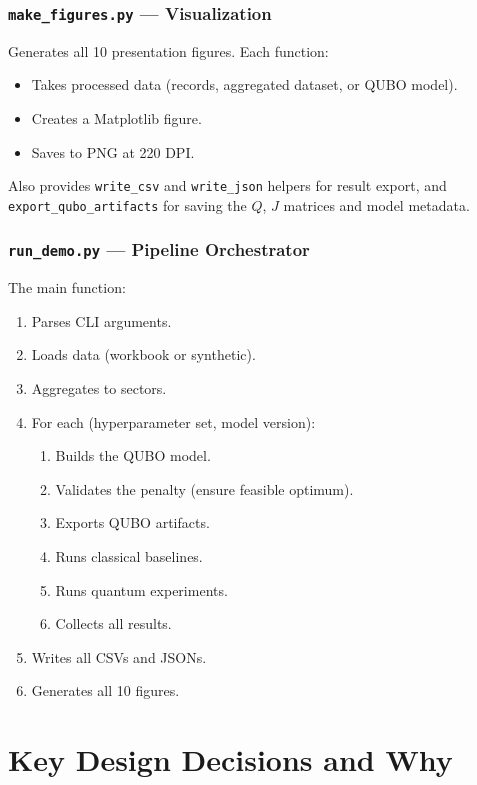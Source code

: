 \documentclass[12pt, a4paper]{article}
\begin{document}
\subsubsection{\texttt{make\_figures.py} --- Visualization}

Generates all 10 presentation figures. Each function:
\begin{itemize}
    \item Takes processed data (records, aggregated dataset, or QUBO model).
    \item Creates a Matplotlib figure.
    \item Saves to PNG at 220 DPI.
\end{itemize}

Also provides \texttt{write\_csv} and \texttt{write\_json} helpers for result export, and \texttt{export\_qubo\_artifacts} for saving the $Q$, $J$ matrices and model metadata.

\subsubsection{\texttt{run\_demo.py} --- Pipeline Orchestrator}

The main function:
\begin{enumerate}
    \item Parses CLI arguments.
    \item Loads data (workbook or synthetic).
    \item Aggregates to sectors.
    \item For each (hyperparameter set, model version):
    \begin{enumerate}
        \item Builds the QUBO model.
        \item Validates the penalty (ensure feasible optimum).
        \item Exports QUBO artifacts.
        \item Runs classical baselines.
        \item Runs quantum experiments.
        \item Collects all results.
    \end{enumerate}
    \item Writes all CSVs and JSONs.
    \item Generates all 10 figures.
\end{enumerate}


\section{Key Design Decisions and Why}
\end{document}
